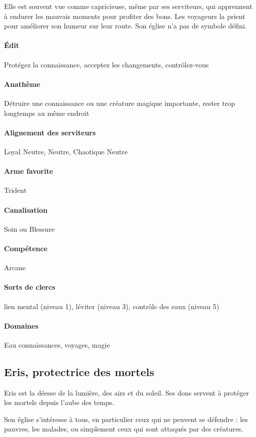 \documentclass[10pt,a4paper]{book}
\begin{document}
Elle est souvent vue comme capricieuse, même par ses serviteurs, qui apprennent à endurer les mauvais moments pour profiter des bons. Les voyageurs la prient pour améliorer son humeur sur leur route. Son église n'a pas de symbole défini.
\paragraph{Édit} Protégez la connaissance, acceptez les changements, contrôlez-vous
\paragraph{Anathème} Détruire une connaissance ou une créature magique importante, rester trop longtemps au même endroit
\paragraph{Alignement des serviteurs} Loyal Neutre, Neutre, Chaotique Neutre
\paragraph{Arme favorite }Trident
\paragraph{Canalisation} Soin ou Blessure
\paragraph{Compétence} Arcane
\paragraph{Sorts de clercs} lien mental (niveau 1), léviter (niveau 3), contrôle des eaux (niveau 5)
\paragraph{Domaines } Eau connaissances, voyages, magie
\subsection{Eris, protectrice des mortels}
Eris est la déesse de la lumière, des airs et du soleil. Ses dons servent à protéger les mortels depuis l'aube des temps.

Son église s'intéresse à tous, en particulier ceux qui ne peuvent se défendre : les pauvres, les malades, ou simplement ceux qui sont attaqués par des créatures.
\end{document}
